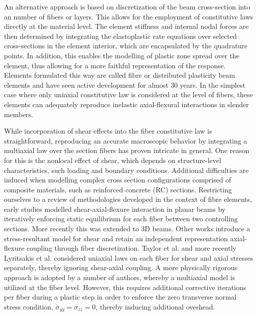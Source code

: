 An alternative approach is based on discretization of the beam cross-section
into an number of fibers or layers. This allows for the employment of 
constitutive laws directly at the material level. The element 
stiffness and internal nodal forces are then determined by integrating 
the elastoplastic rate equations over selected cross-sections in the element
interior, which are encapsulated by the quadrature points. In addition, 
this enables the
modelling of plastic zone spread over the element, thus allowing for a more 
faithful representation of the response. Elements formulated this way
are called fibre or distributed plasticity beam
elements\cite{Kaba1984,Zeris1988,Taucer1991,Spacone1992,Scordelis1984} and
have seen active development for almost 30 years. In the simplest case where
only uniaxial constitutive law is considered at the level of fibers, these
elements can adequately reproduce inelastic axial-flexural interactions in 
slender members. 

While incorporation of shear effects into the fiber constitutive law is
straightforward, reproducing an accurate macroscopic behavior by integrating
a multiaxial law over the section fibers has proven intricate in general. 
One reason for
this is the nonlocal effect of shear, which depends on structure-level 
characteristics, such loading and boundary conditions\cite{Drucker1956}.
Additional difficulties are induced when modelling complex cross section
configurations comprised of composite materials, such as reinforced 
concrete (RC) sections. Restricting ourselves to a
review of methodologies developed in the context of fibre
elements, early studies\cite{Vecchio1986,Vecchio1988} modelled
shear-axial-flexure interaction in planar beams by iteratively enforcing 
static equilibrium for each fiber between two controlling sections. More
recently this was extended to 3D beams\cite{Bairan2007}. Other works 
introduce a stress-resultant model for shear and retain an independent 
representation axial-flexure coupling through fiber 
discretization\cite{Ranzo1998,Martino2000,Marini2006}. Taylor et
al.\cite{Taylor2003} and more recently Lyritsakis et al.\cite{Lyritsakis2021}
considered uniaxial laws on each fiber for shear and axial stresses 
separately, thereby ignoring shear-axial coupling. A more physically
rigorous approach is adopted by a number of
authors\cite{Papachristidis2010,Saritas2009,Ceresa2009,Gregori2007,Kagermanov2017},
whereby a multiaxial model is utilized at the fiber level. However, this
requires additional corrective iterations per
fiber\cite{Klinkel2002,Dodds1987,DeSouza2011} during a plastic 
step in order to enforce the zero transverse normal stress condition,
$\sigma_{yy}=\sigma_{zz}=0$, thereby inducing additional overhead.

